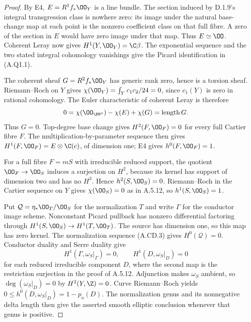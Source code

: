 \begin{proof}
By E4, $E=R^1f_*\OO_Y$ is a line bundle. The section
induced by D.1.9's integral transgression class is
nowhere zero: its image under the natural base-change
map at each point is the nonzero coefficient class on
that full fibre. A zero of the section in $E$ would
have zero image under that map. Thus $E\simeq\OO$.
Coherent Leray now gives $H^1(Y,\OO_Y)=\C\beta$.
The exponential sequence and the two stated integral
cohomology vanishings give the Picard identification
in (A.Q1.1).

The coherent sheaf $G=R^2f_*\OO_Y$ has generic rank
zero, hence is a torsion sheaf. Riemann--Roch on $Y$
gives $\chi(\OO_Y)=\int_Yc_1c_2/24=0$, since
$c_1(Y)$ is zero in rational cohomology. The Euler
characteristic of coherent Leray is therefore
\[
 0=\chi(\OO_{\PP^1})-\chi(E)+\chi(G)
      =\operatorname{length}G.
\]
Thus $G=0$. Top-degree base change gives
$H^2(F,\OO_F)=0$ for every full Cartier fibre $F$.
The multiplication-by-parameter sequence then gives
$H^1(F,\OO_F)=E\otimes\C(c)$, of dimension one;
E4 gives $h^0(F,\OO_F)=1$.

For a full fibre $F=mS$ with irreducible reduced
support, the quotient $\OO_F\to\OO_S$ induces a
surjection on $H^2$, because its kernel has support
of dimension two and has no $H^3$.
Hence $h^2(S,\OO_S)=0$. Riemann--Roch in the Cartier
sequence on $Y$ gives $\chi(\OO_S)=0$ as in A.5.12,
so $h^1(S,\OO_S)=1$.

Put $\mathcal Q=\eta_*\OO_T/\OO_S$ for the
normalization $T$ and write $\Gamma$ for the conductor
image scheme. Nonconstant Picard pullback has nonzero
differential factoring through
$H^1(S,\OO_S)\to H^1(T,\OO_T)$.
The source has dimension one, so this map has zero
kernel. The normalization sequence (A.CD.3) gives
$H^0(\mathcal Q)=0$. Conductor duality and Serre
duality give
\[
 H^1(\Gamma,\omega_S|_\Gamma)=0,
 \qquad H^1(D,\omega_S|_D)=0                      \tag{A.Q1.2}
\]
for each reduced irreducible component $D$, where
the second map is the restriction surjection in the
proof of A.5.12. Adjunction makes $\omega_S$ ambient,
so $\deg(\omega_S|_D)=0$ by $H^2(Y,\Z)=0$.
Curve Riemann--Roch yields
$0\le h^0(D,\omega_S|_D)=1-p_a(D)$.
The normalization genus and its nonnegative delta
length then give the asserted smooth elliptic
conclusion whenever that genus is positive.
\end{proof}

